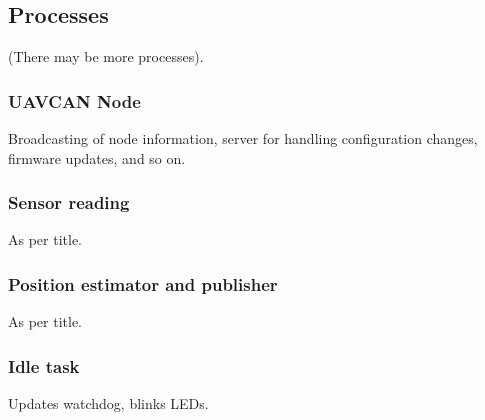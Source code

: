 \subsection{Processes}
(There may be more processes).


\subsubsection{UAVCAN Node}
Broadcasting of node information, server for handling configuration changes, firmware updates, and so on.

\subsubsection{Sensor reading}
As per title.

\subsubsection{Position estimator and publisher}
As per title.

\subsubsection{Idle task}
Updates watchdog, blinks LEDs.
